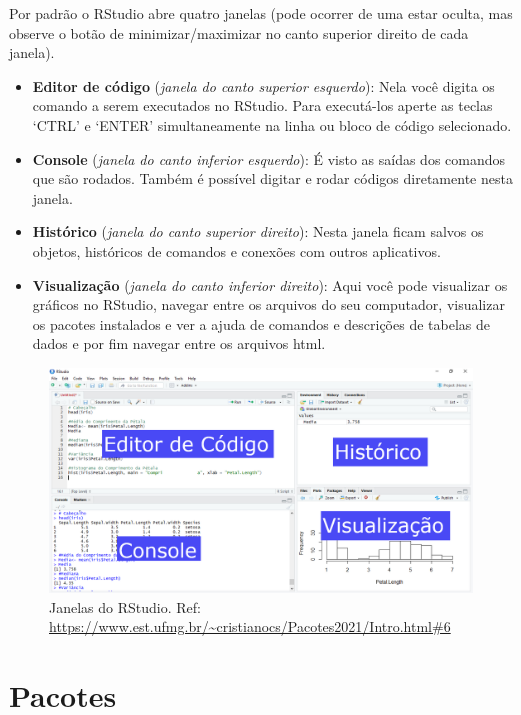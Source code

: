 \documentclass[
]{book}
\providecommand{\tightlist}{%
  \setlength{\itemsep}{0pt}\setlength{\parskip}{0pt}}
\begin{document}
Por padrão o RStudio abre quatro janelas (pode ocorrer de uma estar oculta, mas observe o botão de minimizar/maximizar no canto superior direito de cada janela).

\begin{itemize}
\tightlist
\item
  \textbf{Editor de código} (\emph{janela do canto superior esquerdo}): Nela você digita os comando a serem executados no RStudio. Para executá-los aperte as teclas `CTRL' e `ENTER' simultaneamente na linha ou bloco de código selecionado.
\item
  \textbf{Console} (\emph{janela do canto inferior esquerdo}): É visto as saídas dos comandos que são rodados. Também é possível digitar e rodar códigos diretamente nesta janela.
\item
  \textbf{Histórico} (\emph{janela do canto superior direito}): Nesta janela ficam salvos os objetos, históricos de comandos e conexões com outros aplicativos.
\item
  \textbf{Visualização} (\emph{janela do canto inferior direito}): Aqui você pode visualizar os gráficos no RStudio, navegar entre os arquivos do seu computador, visualizar os pacotes instalados e ver a ajuda de comandos e descrições de tabelas de dados e por fim navegar entre os arquivos html.
\end{itemize}

\begin{figure}
\centering
\includegraphics{figure/fig1_rstudio.png}
\caption{Janelas do RStudio. Ref: \url{https://www.est.ufmg.br/~cristianocs/Pacotes2021/Intro.html\#6}}
\end{figure}

\hypertarget{pacotes}{%
\section{Pacotes}\label{pacotes}}
\end{document}
